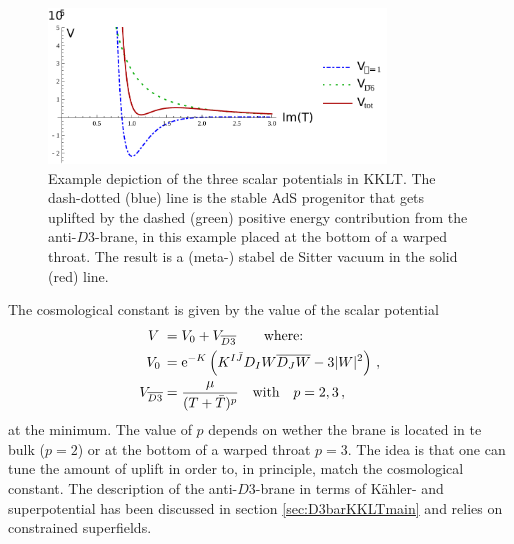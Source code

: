 \documentclass[a4paper,12pt]{report}
\newcommand{\bea}{\begin{equation}\begin{aligned}}
\newcommand{\eea}{\end{aligned}\end{equation}}
\def\rme{{\rm e}}
\begin{document}
\begin{figure}[htp]
     \centering
     \includegraphics[trim=0 0 100 20,clip,width=0.8\textwidth]{kklt_example_3.pdf}
     \caption{Example depiction of the three scalar potentials in KKLT. The dash-dotted (blue) line is the stable AdS progenitor that gets uplifted by the dashed (green) positive energy contribution from the anti-$D3$-brane, in this example placed at the bottom of a warped throat. The result is a (meta-) stabel de Sitter vacuum in the solid (red) line.}
     \label{fig:KKLTscalpot}
\end{figure}
The cosmological constant is given by the value of the scalar potential
\bea
V\; &= V_{0} + V_{\overline{D3}} \qquad \text{where:}\\
V_{0}\, &= \rme^{-K} \left( K^{I\bar{J}} D_I W \overline{D_J W} - 3 |W|^2\right)\,,\\
V_{\overline{D3}} &= \frac{\mu}{(T + \bar{T})^p} \quad \text{with} \quad p=2,3\,,
\eea
at the minimum. The value of $p$ depends on wether the brane is located in te bulk ($p=2$) or at the bottom of a warped throat $p=3$. The idea is that one can tune the amount of uplift in order to, in principle, match the cosmological constant. The description of the anti-$D3$-brane in terms of Kähler- and superpotential has been discussed in section \ref{sec:D3barKKLTmain} and relies on constrained superfields.\\
\end{document}
